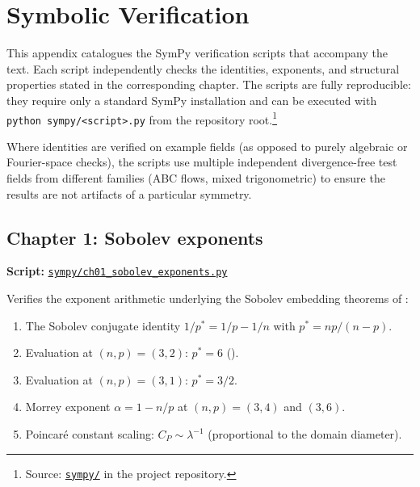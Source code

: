 \chapter{Symbolic Verification}\label{app:sympy}

This appendix catalogues the SymPy verification scripts that accompany the text.
Each script independently checks the identities, exponents, and structural properties
stated in the corresponding chapter.  The scripts are fully reproducible: they require
only a standard SymPy installation and can be executed with
\texttt{python sympy/<script>.py} from the repository
root.\footnote{Source:
\href{https://github.com/alejandro-soto-franco/navier-stokes/tree/main/sympy}%
{\texttt{sympy/}} in the project repository.}

Where identities are verified on example fields (as opposed to purely algebraic or
Fourier-space checks), the scripts use multiple independent divergence-free test fields
from different families (ABC flows, mixed trigonometric) to ensure the results are not
artifacts of a particular symmetry.

\section{Chapter 1: Sobolev exponents}
\label{sec:sympy-ch01-sobolev}

\textbf{Script:}
\href{https://github.com/alejandro-soto-franco/navier-stokes/blob/main/sympy/ch01_sobolev_exponents.py}%
{\texttt{sympy/ch01\_sobolev\_exponents.py}}

\medskip\noindent
Verifies the exponent arithmetic underlying the Sobolev embedding theorems of
:
\begin{enumerate}[label=(\roman*)]
  \item The Sobolev conjugate identity $1/p^{*} = 1/p - 1/n$ with
    $p^{*} = np/(n-p)$.
  \item Evaluation at $(n,p) = (3,2)$: $p^{*} = 6$
    ().
  \item Evaluation at $(n,p) = (3,1)$: $p^{*} = 3/2$.
  \item Morrey exponent $\alpha = 1 - n/p$ at $(n,p) = (3,4)$ and $(3,6)$.
  \item Poincar\'{e} constant scaling: $C_P \sim \lambda^{-1}$
    (proportional to the domain diameter).
\end{enumerate}

